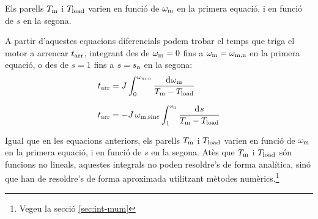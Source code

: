 Els parells $T_\mathrm{m}$ i $T_\mathrm{load}$ varien en funció de $\omega_\mathrm{m}$ en la primera equació, i en funció de $s$ en la segona.

A partir d'aquestes equacions diferencials podem trobar el temps que triga el motor a arrencar $t_\mathrm{arr}$, integrant des de $\omega_\mathrm{m}=0$ fins a $\omega_\mathrm{m}=\omega_\mathrm{m,n}$ en la primera equació, o des de $s = 1$ fins a $s = s_\mathrm{n}$ en la segona:
\begin{subequations}
\begin{align}
    t\ped{arr} &= J\int_{0}^{\omega\ped{m,n}} \frac{\diff\omega\ped{m}}{T\ped{m}-T\ped{load}}\label{eq:tarr-mot}\\[1.5ex]
    t\ped{arr} &= - J\,\omega\ped{m,sinc} \int_{1}^{s\ped{n}} \frac{\diff s}{T\ped{m}-T\ped{load}}
\end{align}
\end{subequations}

Igual que en les equacions anteriors, els parells $T_\mathrm{m}$ i $T_\mathrm{load}$ varien en funció de $\omega_\mathrm{m}$ en la primera equació, i en funció de $s$ en la segona. Atès que $T_\mathrm{m}$ i $T_\mathrm{load}$ són funcions no lineals, aquestes integrals no poden resoldre's de forma analítica, sinó que han de resoldre's de forma aproximada utilitzant mètodes numèrics.\footnote{Vegeu la secció \ref{sec:int-mum}}


